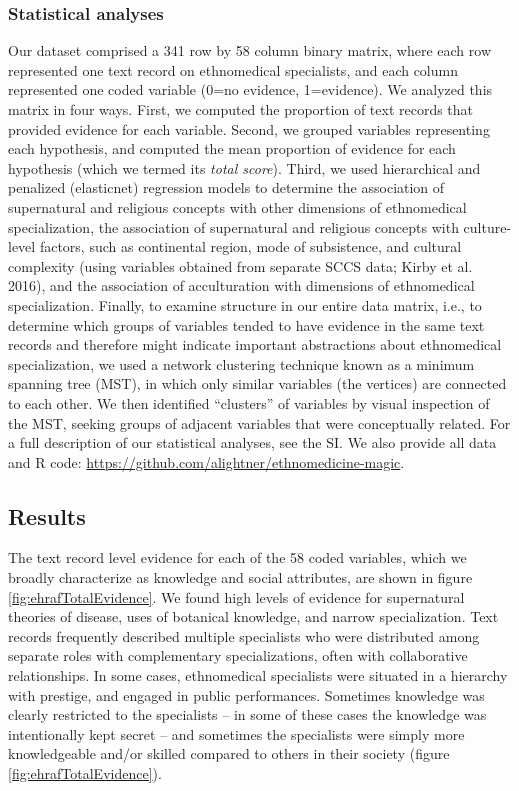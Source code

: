 \documentclass[
  11pt,
]{article}
\begin{document}
\hypertarget{statistical-analyses}{%
\subsubsection{Statistical analyses}\label{statistical-analyses}}

Our dataset comprised a 341 row by 58 column binary matrix, where each row represented one text record on ethnomedical specialists, and each column represented one coded variable (0=no evidence, 1=evidence). We analyzed this matrix in four ways. First, we computed the proportion of text records that provided evidence for each variable. Second, we grouped variables representing each hypothesis, and computed the mean proportion of evidence for each hypothesis (which we termed its \emph{total score}). Third, we used hierarchical and penalized (elasticnet) regression models to determine the association of supernatural and religious concepts with other dimensions of ethnomedical specialization, the association of supernatural and religious concepts with culture-level factors, such as continental region, mode of subsistence, and cultural complexity (using variables obtained from separate SCCS data; Kirby et al. 2016), and the association of acculturation with dimensions of ethnomedical specialization. Finally, to examine structure in our entire data matrix, i.e., to determine which groups of variables tended to have evidence in the same text records and therefore might indicate important abstractions about ethnomedical specialization, we used a network clustering technique known as a minimum spanning tree (MST), in which only similar variables (the vertices) are connected to each other. We then identified ``clusters'' of variables by visual inspection of the MST, seeking groups of adjacent variables that were conceptually related. For a full description of our statistical analyses, see the SI. We also provide all data and R code: \url{https://github.com/alightner/ethnomedicine-magic}.

\hypertarget{results}{%
\subsection{Results}\label{results}}

The text record level evidence for each of the 58 coded variables, which we broadly characterize as knowledge and social attributes, are shown in figure \ref{fig:ehrafTotalEvidence}. We found high levels of evidence for supernatural theories of disease, uses of botanical knowledge, and narrow specialization. Text records frequently described multiple specialists who were distributed among separate roles with complementary specializations, often with collaborative relationships. In some cases, ethnomedical specialists were situated in a hierarchy with prestige, and engaged in public performances. Sometimes knowledge was clearly restricted to the specialists -- in some of these cases the knowledge was intentionally kept secret -- and sometimes the specialists were simply more knowledgeable and/or skilled compared to others in their society (figure \ref{fig:ehrafTotalEvidence}).
\end{document}
